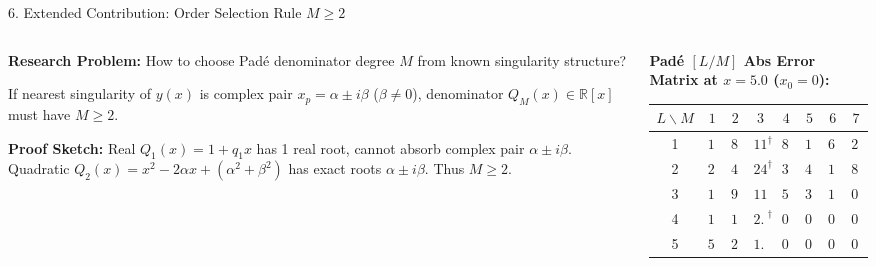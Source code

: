 \documentclass[aspectratio=169]{beamer}
\newcommand{\R}{\mathbb{R}}
\begin{document}
\begin{frame}{6. Extended Contribution: Order Selection Rule $M \geq 2$}
  \small
  \begin{columns}[T]
    \begin{column}{0.48\textwidth}
      \textbf{Research Problem:}
      How to choose Padé denominator degree $M$ from known singularity structure?
      \begin{lemma}
        \footnotemark[1]If nearest singularity of $y(x)$ is complex pair $x_p = \alpha \pm i\beta$ ($\beta \neq 0$), denominator $Q_M(x) \in \R[x]$ must have $M \geq 2$.
      \end{lemma}
      \textbf{Proof Sketch:}
      Real $Q_1(x) = 1 + q_1 x$ has 1 real root, cannot absorb complex pair $\alpha \pm i\beta$. Quadratic $Q_2(x) = x^2 - 2\alpha x + (\alpha^2 + \beta^2)$ has exact roots $\alpha \pm i\beta$. Thus $M \ge 2$.
    \end{column}
    \begin{column}{0.48\textwidth}
      \textbf{Padé $[L/M]$ Abs Error Matrix at $x=5.0$ ($x_0=0$):}
      \centering
      \vskip2pt
      \scriptsize
      \setlength{\tabcolsep}{3pt}
      \begin{tabular}{c|ccccccc}
        \toprule
        $L \backslash M$ & $1$ & $2$ & $3$ & $4$ & $5$ & $6$ & $7$ \\
        \midrule
        1 & \cellcolor{badcell}$129.3$ & \cellcolor{warncell}$80.4$ & \cellcolor{badcell}$111.4^\dagger$ & \cellcolor{warncell}$80.4$ & \cellcolor{badcell}$123.1$ & \cellcolor{warncell}$68.9$ & \cellcolor{badcell}$279.8$ \\
        2 & \cellcolor{badcell}$2121$ & \cellcolor{warncell}$42.7$ & \cellcolor{badcell}$245.7^\dagger$ & \cellcolor{warncell}$32.1$ & \cellcolor{warncell}$43.0$ & \cellcolor{warncell}$13.5$ & \cellcolor{warncell}$8.11$ \\
        3 & \cellcolor{badcell}$124.2$ & \cellcolor{warncell}$9.96$ & \cellcolor{warncell}$11.3$ & \cellcolor{warncell}$5.48$ & \cellcolor{warncell}$3.02$ & \cellcolor{warncell}$1.30$ & \cellcolor{goodcell}$0.537$ \\
        4 & \cellcolor{badcell}$138.4$ & \cellcolor{warncell}$1.82$ & \cellcolor{warncell}$2.30^\dagger$ & \cellcolor{goodcell}$0.822$ & \cellcolor{goodcell}$0.348$ & \cellcolor{goodcell}$0.132$ & \cellcolor{goodcell}$0.046$ \\
        5 & \cellcolor{badcell}$597.3$ & \cellcolor{warncell}$2.28$ & \cellcolor{warncell}$1.90$ & \cellcolor{goodcell}$0.102$ & \cellcolor{goodcell}$0.046$ & \cellcolor{goodcell}$0.015$ & \cellcolor{goodcell}$0.0045$ \\

\end{tabular}
\end{column}
\end{columns}
\end{frame}
\end{document}
